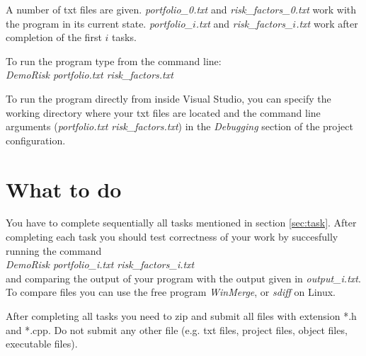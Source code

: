 \documentclass[10pt]{article}
\begin{document}
A number of txt files are given. \textit{portfolio\_0.txt} and \textit{risk\_factors\_0.txt} work with the program in its current state. \textit{portfolio\_$i$.txt} and \textit{risk\_factors\_$i$.txt} work after completion of the first $i$ tasks.

To run the program type from the command line:\\
\textit{DemoRisk portfolio.txt risk\_factors.txt}

To run the program directly from inside Visual Studio, you can specify the working directory where your txt files are located and the command line arguments (\textit{portfolio.txt risk\_factors.txt}) in the \textit{Debugging} section of the project configuration.

\section{What to do}
You have to complete sequentially all tasks mentioned in section \ref{sec:task}. After completing each task you should test correctness of your work by succesfully running the command \\
\textit{DemoRisk portfolio\_i.txt risk\_factors\_i.txt}\\
and comparing the output of your program with the output given in \textit{output\_i.txt}.
To compare files you can use the free program \textit{WinMerge}, or \textit{sdiff} on Linux.

After completing all tasks you need to zip and submit all files with extension *.h and *.cpp. Do not submit any other file (e.g. txt files, project files, object files, executable files).
\end{document}
